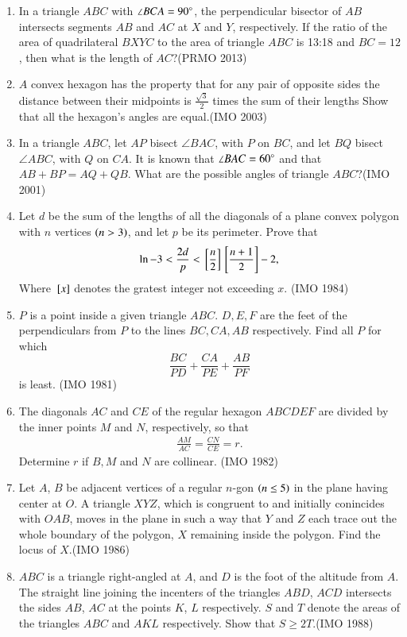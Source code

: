 \begin{enumerate}[label=\thesubsection.\arabic*,ref=\thesubsection.\theenumi]
\item In a triangle $ ABC $ with $ \angle BCA = 90\degree $, the perpendicular bisector of $ AB $ intersects segments $ AB $ and $ AC $ at $ X $ and $ Y $, respectively. If the ratio of the area of quadrilateral $ BXYC $ to the area of triangle $ ABC $ is 13:18 and $ BC = 12 $, then what is the length of $ AC $?\hfill(PRMO 2013)
\item $A$ convex hexagon has the property that for any pair of opposite sides the distance between their midpoints is $\frac{\sqrt{3}}{2}$ times the sum of their lengths Show that all the hexagon's angles are equal.\hfill(IMO 2003)
\item In a triangle $ABC$, let $AP$ bisect $\angle B AC$, with $P$ on $BC$, and let $BQ$ bisect $\angle A BC$, with $Q$ on $CA$. It is known that $\angle BAC= 60\degree$ and that $AB+BP=AQ+QB$. What are the possible angles of triangle $ABC$?\hfill(IMO 2001)
\item Let $d$ be the sum of the lengths of all the diagonals of a plane convex polygon with $n$ vertices $\left(n>3\right)$, and let $p$ be its perimeter. Prove that\begin{align*}                                    \ln -3<\frac{2d}{p}<{}\left[\frac{n}{2}\right]{}\left[\frac{n+1}{2}\right]-2,\end{align*}
		Where ${}\left[x\right]$ denotes the gratest integer not exceeding $x$.  \hfill(IMO 1984)
\item $P$ is a point inside a given triangle $ABC$. $D, E, F$ are the feet of the perpendiculars from $P$ to the lines $BC, CA, AB$ respectively. Find all $P$ for which $$\frac{BC}{PD}+\frac{CA}{PE}+\frac{AB}{PF}$$ is least. \hfill(IMO  1981)
 \item The diagonals $AC$ and $CE$ of the regular hexagon $ABCDEF$ are divided by the inner points $M$ and $N$, respectively, so that \begin{align*} \frac{AM}{AC}=\frac{CN}{CE}=r.
                   \end{align*}
 Determine $r$ if $B, M$ and $N$ are collinear. \hfill(IMO  1982)
    \item Let $A$, $B$ be adjacent vertices of a regular $n$-gon $\left(n\leq5\right)$ in the plane having center at $O$. A triangle $XYZ$, which is congruent to and initially conincides with $OAB$, moves in the plane in such a way that $Y$ and $Z$ each trace out the whole boundary of the polygon, $X$ remaining inside the polygon. Find the locus of $X$.\hfill(IMO  1986)

\item $ABC$ is a triangle right-angled at $A$, and $D$ is the foot of the altitude from $A$. The straight line joining the incenters of the triangles $ABD$, $ACD$ intersects the sides $AB$, $AC$ at the points $K$, $L$ respectively. $S$ and $T$ denote the areas of the triangles $ABC$ and $AKL$ respectively. Show that $S\geq 2T$.\hfill(IMO  1988)
\end{enumerate}
